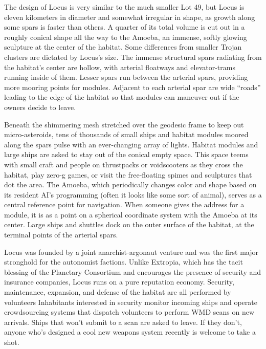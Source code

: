 The design of Locus is very similar to the much 
smaller Lot 49, but Locus is eleven kilometers in diameter
and somewhat irregular in shape, as growth
along some spars is faster than others. A quarter of its 
total volume is cut out in a roughly conical shape all 
the way to the Amoeba, an immense, softly glowing 
sculpture at the center of the habitat. Some differences 
from smaller Trojan clusters are dictated by Locus's 
size. The immense structural spars radiating from the 
habitat's center are hollow, with arterial floatways and 
elevator-trams running inside of them. Lesser spars 
run between the arterial spars, providing more mooring
points for modules. Adjacent to each arterial spar
are wide ``roads'' leading to the edge of the habitat so 
that modules can maneuver out if the owners decide 
to leave.

Beneath the shimmering mesh stretched over the 
geodesic frame to keep out micro-asteroids, tens of 
thousands of small ships and habitat modules moored 
along the spars pulse with an ever-changing array 
of lights. Habitat modules and large ships are asked 
to stay out of the conical empty space. This space 
teems with small craft and people on thrustpacks or 
voidscooters as they cross the habitat, play zero-g 
games, or visit the free-floating spimes and sculptures 
that dot the area. The Amoeba, which periodically 
changes color and shape based on its resident AI's 
programming (often it looks like some sort of animal), 
serves as a central reference point for navigation. 
When someone gives the address for a module, it is 
as a point on a spherical coordinate system with the 
Amoeba at its center. Large ships and shuttles dock on 
the outer surface of the habitat, at the terminal points 
of the arterial spars.

Locus was founded by a joint anarchist-argonaut 
venture and was the first major stronghold for 
the autonomist factions. Unlike Extropia, which 
has the tacit blessing of the Planetary Consortium 
and encourages the presence of security and insurance
companies, Locus runs on a pure reputation
economy. Security, maintenance, expansion, and 
defense of the habitat are all performed by volunteers
Inhabitants interested in security monitor
incoming ships and operate crowdsourcing systems 
that dispatch volunteers to perform WMD scans on 
new arrivals. Ships that won't submit to a scan are 
asked to leave. If they don't, anyone who's designed 
a cool new weapons system recently is welcome to 
take a shot.


